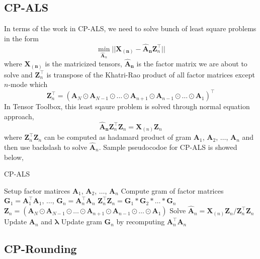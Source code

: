 \documentclass{article}
\newcommand{\mat}[1]{\mathbf{#1}}
\newcommand{\M}[2][]{\bm{#1{\mathbf{\MakeUppercase{#2}}}}} 		%
\newcommand{\T}[2][]{#1{\mathbf{\cal{#2}}}} 						%
\begin{document}
\subsection*{CP-ALS}
In terms of the work in CP-ALS, we need to solve bunch of least square problems in the form 
$$\min_{\mat{\hat{A}}_n}||\mat{X_{(n)}} - {\mat{\hat{A}_n}}\mat{Z}^\top_n ||$$
where $\mat{X_{(n)}}$ is the matricized tensors, $\mat{\hat{A}_n}$ is the factor matrix we are about to solve and 
$\mat{Z}^\top_n$ is transpose of the Khatri-Rao product of all factor matrices except $n$-mode which
$$\mat{Z}^\top_n = (\mat{A}_N \odot \mat{A}_{N-1} \odot \dots \odot \mat{A}_{n+1} \odot \mat{A}_{n-1} \odot \dots \odot \mat{A}_1)^\top $$ 
In Tensor Toolbox, this least sqaure problem is solved through normal equation approach,
$$\mat{\hat{A}_n}\mat{Z}_n^\top\mat{Z}_n = \mat{X}_{(n)}\mat{Z}_n$$
where $\mat{Z}_n^\top\mat{Z}_n$ can be computed as hadamard product of gram $\mat{A}_{1}$, $\mat{A}_{2}$, $\dots$, $\mat{A}_{n}$
and then use backslash to solve $\mat{\hat{A}}_n$. Sample pseudocodoe for CP-ALS is showed below,

\begin{algorithm}[!ht]
  \caption{CP-ALS}
  \label{alg:cp-als}
  \begin{algorithmic}[1]\footnotesize
    
    \Function{$[\bm{\lambda},\M{A}_{n}]=$ CP-ALS}{$\T{X},R$}
      \State Setup factor matirces  $\mat{A}_1$, $\mat{A}_2$, $\dots$, $\mat{A}_n$
      \State Compute gram of factor matrices $\mat{G}_1 = \mat{A}_1^\top \mat{A}_1$, $\dots$, $\mat{G}_n = \mat{A}_n^\top \mat{A}_n$  
      \State $\mat{Z}_n^\top\mat{Z}_n = \mat{G}_1 \ast \mat{G}_2 \ast \dots \ast \mat{G}_n$
      \State $\mat{Z}_n =  (\mat{A}_N \odot \mat{A}_{N-1} \odot \dots \odot \mat{A}_{n+1} \odot \mat{A}_{n-1} \odot \dots \odot \mat{A}_1)$
      \State Solve $\mat{\hat{A}}_n = \mat{X}_{(n)}\mat{Z}_n / \mat{Z}_n^\top\mat{Z}_n$
      \State Update $\mat{A}_n$ and $\bm{\lambda}$
      \State Update gram $\mat{G}_n$ by recomputing $\mat{A}_n^\top\mat{A}_n$
      
      \EndFor
      \EndWhile
    \EndFunction
    
  \end{algorithmic}
\end{algorithm}





\subsection*{CP-Rounding}
\end{document}
